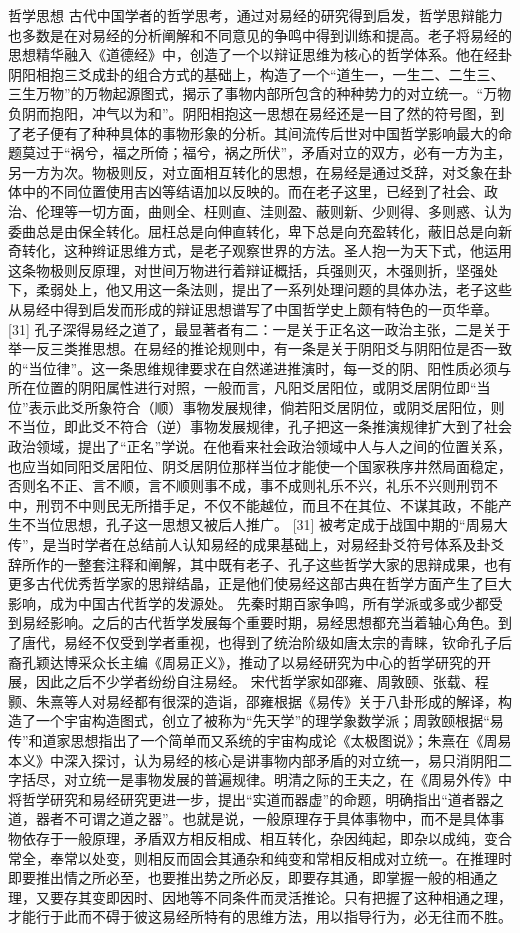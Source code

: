 \documentclass[12pt,UTF8]{ctexbook}
\begin{document}
哲学思想
古代中国学者的哲学思考，通过对易经的研究得到启发，哲学思辩能力也多数是在对易经的分析阐解和不同意见的争鸣中得到训练和提高。老子将易经的思想精华融入《道德经》中，创造了一个以辩证思维为核心的哲学体系。他在经卦阴阳相抱三爻成卦的组合方式的基础上，构造了一个“道生一，一生二、二生三、三生万物”的万物起源图式，揭示了事物内部所包含的种种势力的对立统一。“万物负阴而抱阳，冲气以为和”。阴阳相抱这一思想在易经还是一目了然的符号图，到了老子便有了种种具体的事物形象的分析。其间流传后世对中国哲学影响最大的命题莫过于“祸兮，福之所倚；福兮，祸之所伏”，矛盾对立的双方，必有一方为主，另一方为次。物极则反，对立面相互转化的思想，在易经是通过爻辞，对爻象在卦体中的不同位置使用吉凶等结语加以反映的。而在老子这里，已经到了社会、政治、伦理等一切方面，曲则全、枉则直、洼则盈、蔽则新、少则得、多则惑、认为委曲总是由保全转化。屈枉总是向伸直转化，卑下总是向充盈转化，蔽旧总是向新奇转化，这种辫证思维方式，是老子观察世界的方法。圣人抱一为天下式，他运用这条物极则反原理，对世间万物进行着辩证概括，兵强则灭，木强则折，坚强处下，柔弱处上，他又用这一条法则，提出了一系列处理问题的具体办法，老子这些从易经中得到启发而形成的辩证思想谱写了中国哲学史上颇有特色的一页华章。 [31]
孔子深得易经之道了，最显著者有二：一是关于正名这一政治主张，二是关于举一反三类推思想。在易经的推论规则中，有一条是关于阴阳爻与阴阳位是否一致的“当位律”。这一条思维规律要求在自然递进推演时，每一爻的阴、阳性质必须与所在位置的阴阳属性进行对照，一般而言，凡阳爻居阳位，或阴爻居阴位即“当位”表示此爻所象符合（顺）事物发展规律，倘若阳爻居阴位，或阴爻居阳位，则不当位，即此爻不符合（逆）事物发展规律，孔子把这一条推演规律扩大到了社会政治领域，提出了“正名”学说。在他看来社会政治领域中人与人之间的位置关系，也应当如同阳爻居阳位、阴爻居阴位那样当位才能使一个国家秩序井然局面稳定，否则名不正、言不顺，言不顺则事不成，事不成则礼乐不兴，礼乐不兴则刑罚不中，刑罚不中则民无所措手足，不仅不能越位，而且不在其位、不谋其政，不能产生不当位思想，孔子这一思想又被后人推广。 [31]
被考定成于战国中期的“周易大传”，是当时学者在总结前人认知易经的成果基础上，对易经卦爻符号体系及卦爻辞所作的一整套注释和阐解，其中既有老子、孔子这些哲学大家的思辩成果，也有更多古代优秀哲学家的思辩结晶，正是他们使易经这部古典在哲学方面产生了巨大影响，成为中国古代哲学的发源处。
先秦时期百家争鸣，所有学派或多或少都受到易经影响。之后的古代哲学发展每个重要时期，易经思想都充当着轴心角色。到了唐代，易经不仅受到学者重视，也得到了统治阶级如唐太宗的青睐，钦命孔子后裔孔颖达博采众长主编《周易正义》，推动了以易经研究为中心的哲学研究的开展，因此之后不少学者纷纷自注易经。
宋代哲学家如邵雍、周敦颐、张载、程颢、朱熹等人对易经都有很深的造诣，邵雍根据《易传》关于八卦形成的解译，构造了一个宇宙构造图式，创立了被称为“先天学”的理学象数学派；周敦颐根据“易传”和道家思想指出了一个简单而又系统的宇宙构成论《太极图说》；朱熹在《周易本义》中深入探讨，认为易经的核心是讲事物内部矛盾的对立统一，易只消阴阳二字括尽，对立统一是事物发展的普遍规律。明清之际的王夫之，在《周易外传》中将哲学研究和易经研究更进一步，提出“实道而器虚”的命题，明确指出“道者器之道，器者不可谓之道之器”。也就是说，一般原理存于具体事物中，而不是具体事物依存于一般原理，矛盾双方相反相成、相互转化，杂因纯起，即杂以成纯，变合常全，奉常以处变，则相反而固会其通杂和纯变和常相反相成对立统一。在推理时即要推出情之所必至，也要推出势之所必反，即要存其通，即掌握一般的相通之理，又要存其变即因时、因地等不同条件而灵活推论。只有把握了这种相通之理，才能行于此而不碍于彼这易经所特有的思维方法，用以指导行为，必无往而不胜。
\end{document}
